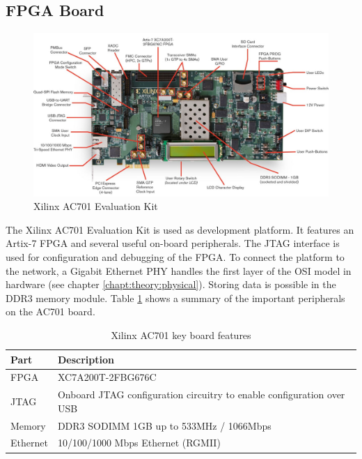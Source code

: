 \subsection{FPGA Board} \label{chapt:mission:fpgaboard}
\begin{figure}[tb!]
    \centering
    \includegraphics[width=\textwidth]{images/mission/ac701.png}
    \caption{Xilinx AC701 Evaluation Kit \cite{image_ac701}}
    \label{fig:ac701}
\end{figure}

The Xilinx AC701 Evaluation Kit is used as development platform. It features an
Artix-7 FPGA and several useful on-board peripherals. The JTAG interface is used
for configuration and debugging of the FPGA. To connect the platform to the
network, a Gigabit Ethernet PHY handles the first layer of the OSI model in
hardware (see chapter \ref{chapt:theory:physical}). Storing data is possible in the DDR3 memory
module. Table \ref{tab:ac701} shows a summary of the important peripherals on
the AC701 board.

\begin{table}[b!]
    \centering
    \begin{tabular}{l l}
        \toprule
        Part & Description \\
        \midrule
        FPGA & XC7A200T-2FBG676C \\
        JTAG & Onboard JTAG configuration circuitry to enable configuration over USB \\
        Memory & DDR3 SODIMM 1GB up to 533MHz / 1066Mbps \\
        Ethernet & 10/100/1000 Mbps Ethernet (RGMII) \\
        \bottomrule
    \end{tabular}
    \caption{Xilinx AC701 key board features \cite{xilinx_ac701}}
    \label{tab:ac701}
\end{table}

